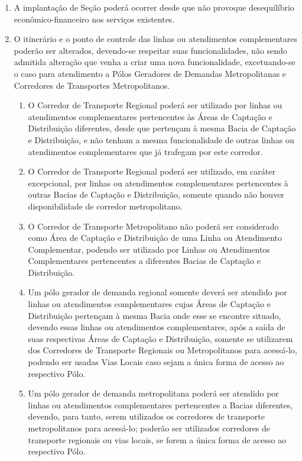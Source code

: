 \begin{enumerate}[resume, label=Art. \arabic*]
\begin{enumerate}[label=\roman*.]
\end{enumerate}

\item A implantação de Seção poderá ocorrer desde que não provoque desequilíbrio econômico-financeiro nos serviços existentes.

\item O itinerário e o ponto de controle das linhas ou atendimentos complementares poderão ser alterados, devendo-se respeitar suas funcionalidades, não sendo admitida alteração que venha a criar uma nova funcionalidade, excetuando-se o caso para atendimento a Pólos Geradores de Demandas Metropolitanas e Corredores de Transportes Metropolitanos.

\begin{enumerate}[label= \S \arabic*] %

\item O Corredor de Transporte Regional poderá ser utilizado por linhas ou atendimentos complementares pertencentes às Áreas de Captação e Distribuição diferentes, desde que pertençam à mesma Bacia de Captação e Distribuição, e não tenham a mesma funcionalidade de outras linhas ou atendimentos complementares que já trafegam por este corredor.

\item O Corredor de Transporte Regional poderá ser utilizado, em caráter excepcional, por linhas ou atendimentos complementares pertencentes à outras Bacias de Captação e Distribuição, somente quando não houver disponibilidade de corredor metropolitano.

\item O Corredor de Transporte Metropolitano não poderá ser considerado como Área de Captação e Distribuição de uma Linha ou Atendimento Complementar, podendo ser utilizado por Linhas ou Atendimentos Complementares pertencentes a diferentes Bacias de Captação e Distribuição.

\item Um pólo gerador de demanda regional somente deverá ser atendido por linhas ou atendimentos complementares cujas Áreas de Captação e Distribuição pertençam à mesma Bacia onde esse se encontre situado, devendo essas linhas ou atendimentos complementares, após a saída de suas respectivas Áreas de Captação e Distribuição, somente se utilizarem dos Corredores de Transporte Regionais ou Metropolitanos para acessá-lo, podendo ser usadas Vias Locais caso sejam a única forma de acesso ao respectivo Pólo.

\item Um pólo gerador de demanda metropolitana poderá ser atendido por linhas ou atendimentos complementares pertencentes a Bacias diferentes, devendo, para tanto, serem utilizados os corredores de transporte metropolitanos para acessá-lo; poderão ser utilizados corredores de transporte regionais ou vias locais, se forem a única forma de acesso ao respectivo Pólo.


\end{enumerate}
\end{enumerate}
